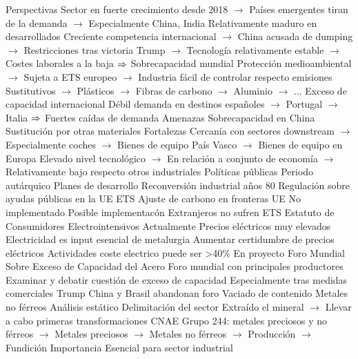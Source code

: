 \documentclass{nuevotema}
\begin{document}
\begin{esquemal}
				\4 Perspectivas
				\4[] Sector en fuerte crecimiento desde 2018
				\4[] $\to$ Países emergentes tiran de la demanda
				\4[] $\to$ Especialmente China, India
				\4[] Relativamente maduro en desarrollados
				\4[] Creciente competencia internacional
				\4[] $\to$ China acusada de dumping
				\4[] $\to$ Restricciones tras victoria Trump
				\4[] $\to$ Tecnología relativamente estable
				\4[] $\to$ Costes laborales a la baja
				\4[] $\Rightarrow$ Sobrecapacidad mundial
				\4[] Protección medioambiental
				\4[] $\to$ Sujeta a ETS europeo
				\4[] $\to$ Industria fácil de controlar respecto emisiones
				\4[] Sustitutivos
				\4[] $\to$ Plásticos
				\4[] $\to$ Fibras de carbono
				\4[] $\to$ Aluminio
				\4[] $\to$ ...
				\4[] Exceso de capacidad internacional
				\4[] Débil demanda en destinos españoles
				\4[] $\to$ Portugal
				\4[] $\to$ Italia
				\4[] $\Rightarrow$ Fuertes caídas de demanda
				\4 Amenazas
				\4[] Sobrecapacidad en China
				\4[] Sustitución por otras materiales
				\4 Fortalezas
				\4[] Cercanía con sectores downstream
				\4[] $\to$ Especialmente coches
				\4[] $\to$ Bienes de equipo País Vasco
				\4[] $\to$ Bienes de equipo en Europa
				\4[] Elevado nivel tecnológico
				\4[] $\to$ En relación a conjunto de economía
				\4[] $\to$ Relativamente bajo respecto otros industriales
			\3 Políticas públicas
				\4 Periodo autárquico
				\4 Planes de desarrollo
				\4 Reconversión industrial años 80
				\4 Regulación sobre ayudas públicas en la UE
				\4 ETS
				\4 Ajuste de carbono en fronteras UE
				\4[] No implementado
				\4[] Posible implementacón
				\4[] Extranjeros no sufren ETS
			\3 Estatuto de Consumidores Electrointensivos
				\4 Actualmente
				\4[] Precios eléctricos muy elevados
				\4[] Electricidad es input esencial de metalurgia
				\4 Aumentar certidumbre de precios eléctricos
				\4 Actividades coste electrico puede ser >40\%
				\4 En proyecto
			\3 Foro Mundial Sobre Exceso de Capacidad del Acero
				\4 Foro mundial con principales productores
				\4 Examinar y debatir cuestión de exceso de capacidad
				\4 Especialmente tras medidas comerciales Trump
				\4 China y Brasil abandonan foro
				\4[$\to$] Vaciado de contenido
		\2 Metales no férreos
			\3 Análisis estático
				\4 Delimitación del sector
				\4[] Extraído el mineral
				\4[] $\to$ Llevar a cabo primeras transformaciones
				\4[] CNAE Grupo 244: metales preciosos y no férreos
				\4[] $\to$ Metales preciosos
				\4[] $\to$ Metales no férreos
				\4[] $\to$ Producción
				\4[] $\to$ Fundición
				\4 Importancia
				\4[] Esencial para sector industrial

\end{esquemal}
\end{document}
